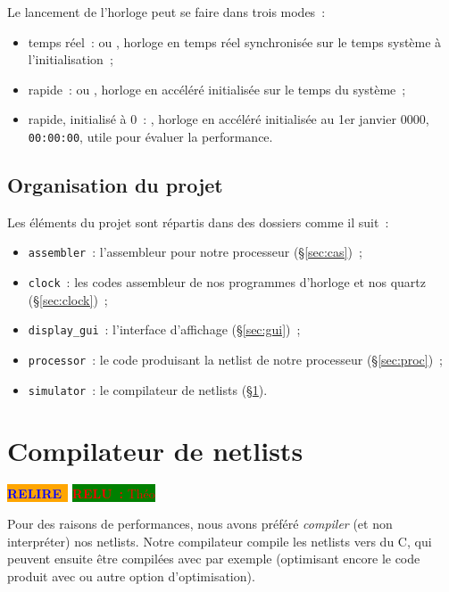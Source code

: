 \documentclass[11pt,a4paper]{article}
\newcommand{\relire}{\colorbox{orange}{\textcolor{blue}{\textbf{RELIRE}~}}}
\newcommand{\relu}[1]{\colorbox{green}{\textcolor{red}{\textbf{RELU~:} #1}}}
\begin{document}
\noindent Le lancement de l'horloge peut se faire dans trois modes~:
\begin{itemize}
\item temps réel~:  ou , horloge en temps réel synchronisée sur le temps système à l'initialisation~;
\item rapide~:  ou , horloge en accéléré initialisée sur le temps du système~;
\item rapide, initialisé à 0~: , horloge en accéléré initialisée au 1er janvier 0000, \verb!00:00:00!, utile pour évaluer la performance.
\end{itemize}

\subsection{Organisation du projet}

Les éléments du projet sont répartis dans des dossiers comme il suit~:
\begin{itemize}
\item \texttt{assembler}~: l'assembleur pour notre processeur (§\ref{sec:cas})~;
\item \texttt{clock}~: les codes assembleur de nos programmes d'horloge et nos quartz (§\ref{sec:clock})~;
\item \texttt{display\_gui}~: l'interface d'affichage (§\ref{sec:gui})~;
\item \texttt{processor}~: le code produisant la netlist de notre processeur (§\ref{sec:proc})~;
\item \texttt{simulator}~: le compilateur de netlists (§\ref{sec:compilo}).
\end{itemize}

\section{Compilateur de netlists} \label{sec:compilo}

\relire
\relu{Théo}

Pour des raisons de performances, nous avons préféré \emph{compiler} (et non interpréter) nos netlists. Notre compilateur compile les netlists vers du C, qui peuvent ensuite être compilées avec  par exemple (optimisant encore le code produit avec  ou autre option d'optimisation).
\end{document}
